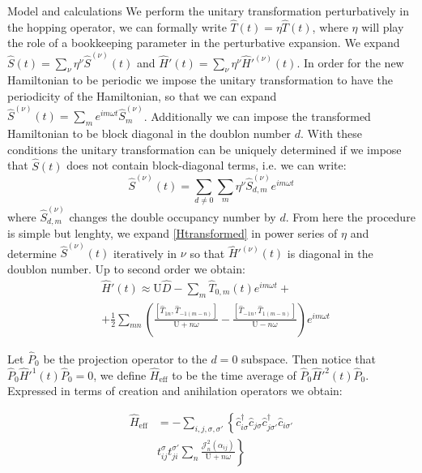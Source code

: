 \documentclass[aps,prl,twocolumn,amsmath,amssymb,superscriptaddress,nobibnotes]{revtex4-1}%
\newcommand{\n}{\nonumber}
\begin{document}
\begin{section}{Model and calculations}
We perform the unitary transformation perturbatively in the hopping operator, we can formally write $\hat{T}(t) = \eta \hat{T}(t)$, where $\eta$ will play the role of a bookkeeping parameter in the perturbative expansion. We expand $\hat{S}(t) = \sum_\nu \eta^\nu \hat{S}^{(\nu)}(t)$ and $\hat{H}'(t) = \sum_\nu \eta^\nu \hat{H}'^{(\nu)}(t)$. In order for the new Hamiltonian to be periodic we impose the unitary transformation to have the periodicity of the Hamiltonian, so that we can expand $\hat{S}^{(\nu)}(t) = \sum_m e^{im\omega t}\hat{S}^{(\nu)}_m$. Additionally we can impose the transformed Hamiltonian to be block diagonal in the doublon number $d$. With these conditions the unitary transformation can be uniquely determined if we impose that $\hat{S}(t)$ does not contain block-diagonal terms, i.e. we can write:
\begin{equation}
\hat{S}^{(\nu)}(t) = \sum_{d \neq 0} \sum_m \eta^\nu \hat{S}^{(\nu)}_{d,m} e^{im\omega t}
\end{equation}
where $\hat{S}^{(\nu)}_{d,m}$ changes the double occupancy number by $d$. From here the procedure is simple but lenghty, we expand \ref{Htransformed} in power series of $\eta$ and determine $\hat{S}^{(\nu)}(t)$ iteratively in $\nu$ so that $\hat{H}'^{(\nu)}(t)$ is diagonal in the doublon number. Up to second order we obtain:
\begin{align}
&\hat{H}'(t) \approx \text{U}\hat{D} - \sum_m \hat{T}_{0,m}(t)e^{im\omega t} + \n \\
&+ \frac{1}{2}\sum_{mn} \left( \frac{\left[\hat{T}_{1n}, \hat{T}_{-1(m-n)} \right]}{\text{U}+n\omega} - \frac{\left[\hat{T}_{-1n}, \hat{T}_{1(m-n)} \right]}{\text{U}-n\omega} \right) e^{im\omega t}
\end{align}

Let $\hat{P}_0$ be the projection operator to the $d=0$ subspace. Then notice that $\hat{P}_0\hat{H}'^{1}(t)\hat{P}_0 = 0$, we define $\hat{H}_{\text{eff}}$ to be the time average of $\hat{P}_0\hat{H}'^{2}(t)\hat{P}_0$. Expressed in terms of creation and anihilation operators we obtain:

\begin{align}
\hat{H}_{\text{eff}} &= - \sum_{i,j, \sigma, \sigma'} \left\{ \hat{c}_{i \sigma}^\dagger \hat{c}_{j \sigma} \hat{c}_{j \sigma'}^\dagger \hat{c}_{i \sigma'} \right. \n \\
&t_{ij}^{\sigma} t_{ji}^{\sigma'} \sum_{n} \frac{\mathcal{J}_{n}^2(\alpha_{ij})}{\text{U}+n\omega} \left. \right\} \label{GeneralHeff}
\end{align}


\end{section}
\end{document}
